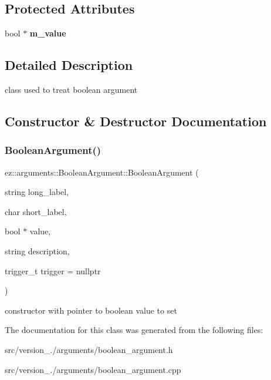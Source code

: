 \subsection*{Protected Attributes}
\begin{DoxyCompactItemize}
\item 
\mbox{\label{classez_1_1arguments_1_1BooleanArgument_a4744f07800453f73d2305bcf92be1ef0}} 
bool $\ast$ {\bfseries m\+\_\+value}
\end{DoxyCompactItemize}


\subsection{Detailed Description}
class used to treat boolean argument 

\subsection{Constructor \& Destructor Documentation}
\mbox{\label{classez_1_1arguments_1_1BooleanArgument_a1d5bfd420e261e25ce2d3efc175ee7b0}} 
\subsubsection{\texorpdfstring{Boolean\+Argument()}{BooleanArgument()}}
{\footnotesize\ttfamily ez\+::arguments\+::\+Boolean\+Argument\+::\+Boolean\+Argument (\begin{DoxyParamCaption}\item[{string}]{long\+\_\+label,  }\item[{char}]{short\+\_\+label,  }\item[{bool $\ast$}]{value,  }\item[{string}]{description,  }\item[{trigger\+\_\+t}]{trigger = {\ttfamily nullptr} }\end{DoxyParamCaption})\hspace{0.3cm}{\ttfamily [inline]}}

constructor with pointer to boolean value to set 

The documentation for this class was generated from the following files\+:\begin{DoxyCompactItemize}
\item 
src/version\+\_./arguments/boolean\+\_\+argument.\+h\item 
src/version\+\_./arguments/boolean\+\_\+argument.\+cpp\end{DoxyCompactItemize}
